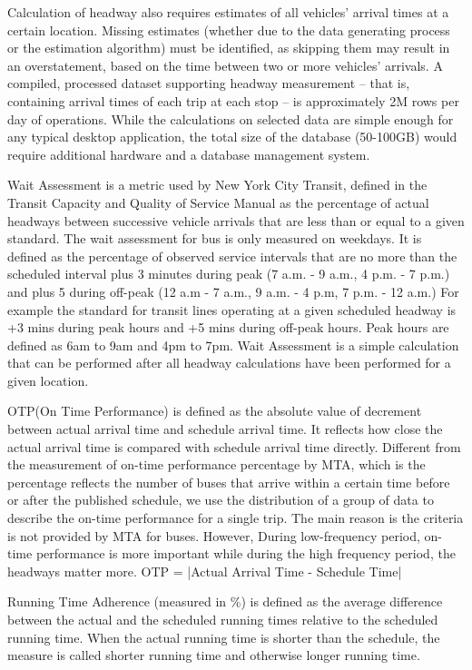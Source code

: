 \documentclass[12pt]{report}
\begin{document}
Calculation of headway also requires estimates of all vehicles' arrival times at a certain location.  Missing estimates (whether due to the data generating process or the estimation algorithm) must be identified, as skipping them may result in an overstatement, based on the time between two or more vehicles' arrivals.  A compiled, processed dataset supporting headway measurement -- that is, containing arrival times of each trip at each stop -- is approximately 2M rows per day of operations.  While the calculations on selected data are simple enough for any typical desktop application, the total size of the database (50-100GB) would require additional hardware and a database management system.

Wait Assessment is a metric used by New York City Transit, defined in the Transit Capacity and Quality of Service Manual as the percentage of actual headways between successive vehicle arrivals that are less than or equal to a given standard. The wait assessment for bus is only measured on weekdays. It is defined as the percentage of observed service intervals that are no more than the scheduled interval plus 3 minutes during peak (7 a.m. - 9 a.m., 4 p.m. - 7 p.m.) and plus 5 during off-peak (12 a.m - 7 a.m., 9 a.m. - 4 p.m, 7 p.m. - 12 a.m.)  For example the standard for transit lines operating at a given scheduled headway is +3 mins during peak hours and +5 mins during off-peak hours.  Peak hours are defined as 6am to 9am and 4pm to 7pm.  Wait Assessment is a simple calculation that can be performed after all headway calculations have been performed for a given location.

OTP(On Time Performance) is defined as the absolute value of decrement between actual arrival time and schedule arrival time. It reflects how close the actual arrival time is compared with schedule arrival time directly. Different from the measurement of on-time performance percentage by MTA, which is the percentage reflects the number of buses that arrive within a certain time before or after the published schedule, we use the distribution of a group of data to describe the on-time performance for a single trip. The main reason is the criteria is not provided by MTA for buses. However, During low-frequency period, on-time performance is more important while during the high frequency period, the headways matter more.
OTP = |Actual Arrival Time - Schedule Time|

Running Time Adherence (measured in \%) is defined as the average difference between the actual and the scheduled running times relative to the scheduled running time. When the actual running time is shorter than the schedule, the measure is called shorter running time and otherwise longer running time.
\end{document}
